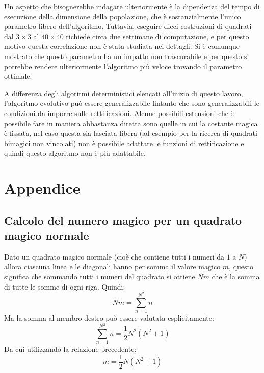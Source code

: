 \documentclass[italian,twoside,twocolumn]{article}
\begin{document}
Un aspetto che bisognerebbe indagare ulteriormente è la dipendenza del tempo di esecuzione della dimensione della popolazione, che è sostanzialmente l'unico parametro libero dell'algoritmo. Tuttavia, eseguire dieci costruzioni di quadrati dal $ 3\times 3 $ al $ 40\times40 $ richiede circa due settimane di computazione, e per questo motivo questa correlazione non è stata studiata nei dettagli. Si è comunque mostrato che questo parametro ha un impatto non trascurabile e per questo si potrebbe rendere ulteriormente l'algoritmo più veloce trovando il parametro ottimale.

A differenza degli algoritmi deterministici elencati all'inizio di questo lavoro, l'algoritmo evolutivo può essere generalizzabile fintanto che sono generalizzabili le condizioni da imporre sulle rettificazioni. Alcune possibili estensioni che è possibile fare in maniera abbastanza diretta sono quelle in cui la costante magica è fissata, nel caso questa sia lasciata libera (ad esempio per la ricerca di quadrati bimagici non vincolati) non è possibile adattare le funzioni di rettificazione e quindi questo algoritmo non è più adattabile. 

\section{Appendice}

\subsection{Calcolo del numero magico per un quadrato magico normale}
Dato un quadrato magico normale (cioè che contiene tutti i numeri da $ 1 $ a $ N $) allora ciascuna linea e le diagonali hanno per somma il valore magico $ \mathit{m} $, questo significa che sommando tutti i numeri del quadrato si ottiene $  N \mathit{m} $ che è la somma di tutte le somme di ogni riga. Quindi:
\[  N \mathit{m} = \sum_{n = 1}^{N^2}n		\]
Ma la somma al membro destro può essere valutata esplicitamente:
\[	\sum_{n = 1}^{N^2}n = \frac{1}{2} N^2 (N^2 + 1)	\]
Da cui utilizzando la relazione precedente:
\[	 \mathit{m} = \frac{1}{2} N (N^2 + 1)	\]
\end{document}

